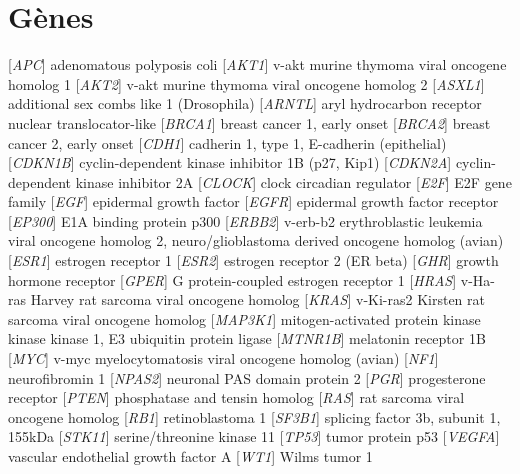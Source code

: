 	\section*{\textcolor{mygrey}{Gènes}}
		\label{app:ac:gènes}
		\begin{acronym}[CDKN2A]
					[\emph{APC}]	{adenomatous polyposis coli}
					[\emph{AKT1}]	{v-akt murine thymoma viral oncogene homolog 1}
					[\emph{AKT2}]	{v-akt murine thymoma viral oncogene homolog 2}
					[\emph{ASXL1}]	{additional sex combs like 1 (Drosophila)}
					[\emph{ARNTL}]	{aryl hydrocarbon receptor nuclear translocator-like}
					[\emph{BRCA1}]	{breast cancer 1, early onset}
					[\emph{BRCA2}]	{breast cancer 2, early onset}
					[\emph{CDH1}]	{cadherin 1, type 1, E-cadherin (epithelial)}
				[\emph{CDKN1B}]	{cyclin-dependent kinase inhibitor 1B (p27, Kip1)}
				[\emph{CDKN2A}]	{cyclin-dependent kinase inhibitor 2A}
					[\emph{CLOCK}]	{clock circadian regulator}
					[\emph{E2F}]	{E2F gene family}
					[\emph{EGF}]	{epidermal growth factor}
					[\emph{EGFR}]	{epidermal growth factor receptor}
					[\emph{EP300}]	{E1A binding protein p300}
					[\emph{ERBB2}]	{v-erb-b2 erythroblastic leukemia viral oncogene homolog 2, neuro/glioblastoma derived oncogene homolog (avian)}
					[\emph{ESR1}]	{estrogen receptor 1}
					[\emph{ESR2}]	{estrogen receptor 2 (ER beta)}
					[\emph{GHR}]	{growth hormone receptor}
					[\emph{GPER}]	{G protein-coupled estrogen receptor 1}
					[\emph{HRAS}]	{v-Ha-ras Harvey rat sarcoma viral oncogene homolog}
					[\emph{KRAS}]	{v-Ki-ras2 Kirsten rat sarcoma viral oncogene homolog}
				[\emph{MAP3K1}]	{mitogen-activated protein kinase kinase kinase 1, E3 ubiquitin protein ligase}
				[\emph{MTNR1B}]	{melatonin receptor 1B}
					[\emph{MYC}]	{v-myc myelocytomatosis viral oncogene homolog (avian)}
					[\emph{NF1}]	{neurofibromin 1}
					[\emph{NPAS2}]	{neuronal PAS domain protein 2}
					[\emph{PGR}]	{progesterone receptor}
					[\emph{PTEN}]	{phosphatase and tensin homolog}
					[\emph{RAS}]	{rat sarcoma viral oncogene homolog}
					[\emph{RB1}]	{retinoblastoma 1}
					[\emph{SF3B1}]	{splicing factor 3b, subunit 1, 155kDa}
					[\emph{STK11}]	{serine/threonine kinase 11}
					[\emph{TP53}]	{tumor protein p53}
					[\emph{VEGFA}]	{vascular endothelial growth factor A}
					[\emph{WT1}]	{Wilms tumor 1}
		\end{acronym}

